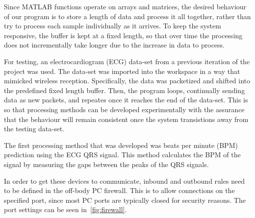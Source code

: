 Since MATLAB functions operate on arrays and matrices,
the desired behaviour of our program is to store a length of data and process it all together,
rather than try to process each sample individually as it arrives.
To keep the system responsive, the buffer is kept at a fixed length,
so that over time the processing does not incrementally take longer due to the increase in data to process.

For testing, an electrocardiogram (ECG) data-set from a previous iteration of the project was used.
The data-set was imported into the workspace in a way that mimicked wireless reception.
Specifically, the data was packetized and shifted into the predefined fixed length buffer.
Then, the program loops, continually sending data as new packets, and repeates once it reaches the end of the data-set.
This is so that processing methods can be developed experimentally
with the assurance that the behaviour will remain consistent once the system transistions away from the testing data-set.

The first processing method that was developed was beats per minute (BPM) prediction using the ECG QRS signal.
This method calculates the BPM of the signal by measuring the gaps between the peaks of the QRS signals.

In order to get these devices to communicate, inbound and outbound rules need to be defined in the off-body PC firewall.
This is to allow connections on the specified port, since most PC ports are typically closed for security reasons.
The port settings can be seen in~\autoref{fig:firewall}.

